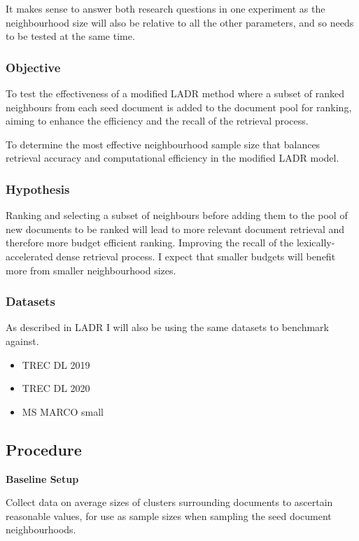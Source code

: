\documentclass[sigconf,authorversion,nonacm]{acmart}
\begin{document}
It makes sense to answer both research questions in one experiment as the neighbourhood size will
also be relative to all the other parameters, and so needs to be tested at the same time.

\subsubsection{Objective}

To test the effectiveness of a modified LADR method where a subset of ranked neighbours from each
seed document is added to the document pool for ranking, aiming to enhance the efficiency and
the recall of the retrieval process.

To determine the most effective neighbourhood sample size that balances retrieval accuracy and
computational efficiency in the modified LADR model.

\subsubsection{Hypothesis}

Ranking and selecting a subset of neighbours before adding them to the pool of new documents to be
ranked will lead to more relevant document retrieval and therefore more budget efficient ranking.
Improving the recall of the lexically-accelerated dense retrieval process. I expect that smaller
budgets will benefit more from smaller neighbourhood sizes.

\subsubsection{Datasets}

As described in LADR\cite{ladr} I will also be using the same datasets to benchmark against.

\begin{itemize}
	\item TREC DL 2019
	\item TREC DL 2020
	\item MS MARCO small
\end{itemize}

\subsection{Procedure}

\textbf{Baseline Setup}

Collect data on average sizes of clusters surrounding documents to ascertain reasonable values, for
use as sample sizes when sampling the seed document neighbourhoods.
\end{document}
